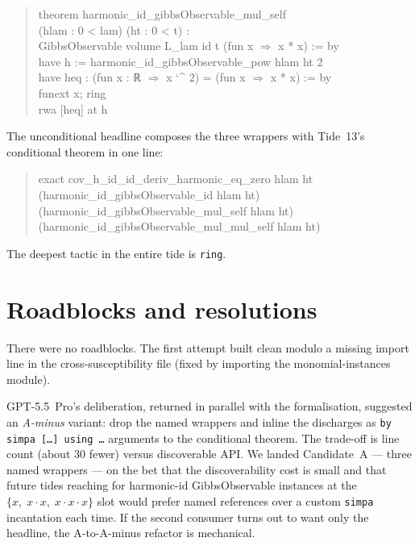 \documentclass[11pt]{article}
\begin{document}
\begin{quote}\small\ttfamily
theorem harmonic\_id\_gibbsObservable\_mul\_self\\
\hspace*{1em}(hlam : 0 < lam) (ht : 0 < t) :\\
\hspace*{1em}GibbsObservable volume L\_lam id t (fun x \(\Rightarrow\) x * x) := by\\
\hspace*{2em}have h := harmonic\_id\_gibbsObservable\_pow hlam ht 2\\
\hspace*{2em}have heq : (fun x : ℝ \(\Rightarrow\) x \char`^{} 2) = (fun x \(\Rightarrow\) x * x) := by\\
\hspace*{4em}funext x; ring\\
\hspace*{2em}rwa [heq] at h
\end{quote}

The unconditional headline composes the three wrappers with Tide~13's
conditional theorem in one line:
\begin{quote}\small\ttfamily
exact cov\_h\_id\_id\_deriv\_harmonic\_eq\_zero hlam ht\\
\hspace*{1em}(harmonic\_id\_gibbsObservable\_id hlam ht)\\
\hspace*{1em}(harmonic\_id\_gibbsObservable\_mul\_self hlam ht)\\
\hspace*{1em}(harmonic\_id\_gibbsObservable\_mul\_mul\_self hlam ht)
\end{quote}

The deepest tactic in the entire tide is \texttt{ring}.

\section{Roadblocks and resolutions}

There were no roadblocks. The first attempt built clean modulo a
missing import line in the cross-susceptibility file (fixed by
importing the monomial-instances module).

GPT-5.5~Pro's deliberation, returned in parallel with the
formalisation, suggested an \emph{A-minus} variant: drop the named
wrappers and inline the discharges as \texttt{by simpa [\dots] using \dots}
arguments to the conditional theorem. The trade-off is line count
(about 30 fewer) versus discoverable API. We landed Candidate~A ---
three named wrappers --- on the bet that the discoverability cost is
small and that future tides reaching for harmonic-id GibbsObservable
instances at the $\{x,\;x \cdot x,\;x \cdot x \cdot x\}$ slot would
prefer named references over a custom \texttt{simpa} incantation each
time. If the second consumer turns out to want only the headline, the
A-to-A-minus refactor is mechanical.
\end{document}
